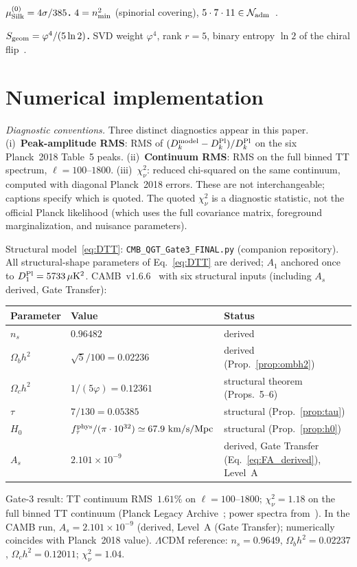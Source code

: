 \documentclass[twocolumn,10pt]{article}
\newcommand{\vp}{\varphi}
\newcommand{\Nadm}{\mathcal{N}_{\rm adm}}
\newcommand{\Sgeom}{S_{\rm geom}}
\newcommand{\mustr}{\mu_{\rm Silk}^{(0)}}
\begin{document}
\noindent\textbf{$\mustr=4\sigma/385$.}
$4=n_{\rm min}^2$ (spinorial covering), $5\cdot7\cdot11\in\Nadm$~\cite{CamKer163}.

\noindent\textbf{$\Sgeom=\vp^4/(5\ln2)$.}
SVD weight $\vp^4$, rank $r=5$, binary entropy $\ln 2$ of the chiral
flip~\cite{CamKer163,CamP14}.

\section{Numerical implementation}
\label{app:C}

\noindent\textit{Diagnostic conventions.}
Three distinct diagnostics appear in this paper.
(i)~\textbf{Peak-amplitude RMS}: RMS of $(D_k^{\rm model}-D_k^{\rm Pl})/D_k^{\rm Pl}$
on the six Planck~2018 Table~5 peaks.
(ii)~\textbf{Continuum RMS}: RMS on the full binned TT spectrum,
$\ell=100$--$1800$.
(iii)~$\chi^2_\nu$: reduced chi-squared on the same continuum,
computed with diagonal Planck~2018 errors.
These are not interchangeable; captions specify which is quoted.
The quoted $\chi^2_\nu$ is a diagnostic statistic, not the official
Planck likelihood (which uses the full covariance matrix, foreground
marginalization, and nuisance parameters).

\medskip

Structural model~\eqref{eq:DTT}: \texttt{CMB\_QGT\_Gate3\_FINAL.py}
(companion repository). All structural-shape parameters of
Eq.~\eqref{eq:DTT} are derived; $A_1$ anchored once
to $D_1^{\rm Pl}=5733\,\mu{\rm K}^2$. CAMB~v1.6.6~\cite{CAMB} with
six structural inputs (including $A_s$ derived, Gate Transfer):
\begin{center}
\small\renewcommand{\arraystretch}{1.2}
\begin{tabular}{p{1.6cm}p{2.6cm}p{3.0cm}}
\toprule
Parameter & Value & Status \\
\midrule
$n_s$ & $0.96482$ & derived \\
$\Omega_bh^2$ & $\sqrt{5}/100=0.02236$ & derived (Prop.~\ref{prop:ombh2}) \\
$\Omega_ch^2$ & $1/(5\vp)=0.12361$ & structural theorem (Props.~5--6) \\
$\tau$ & $7/130=0.05385$ & structural (Prop.~\ref{prop:tau}) \\
$H_0$ & $f_\tau^{\rm phys}/(\pi\cdot10^{32})\simeq67.9~\mathrm{km/s/Mpc}$ & structural (Prop.~\ref{prop:h0}) \\
$A_s$ & $2.101\times10^{-9}$ & derived, Gate Transfer (Eq.~\ref{eq:FA_derived}), Level~A \\
\bottomrule
\end{tabular}
\end{center}
Gate-3 result: TT continuum RMS~$1.61\%$ on $\ell=100$--$1800$; $\chi^2_\nu=1.18$ on
the full binned TT continuum (Planck Legacy Archive~\cite{PLA};
power spectra from~\cite{Planck2018V}).
In the CAMB run, $A_s=2.101\times10^{-9}$ (derived, Level~A (Gate Transfer); numerically coincides with Planck~2018 value).
$\Lambda$CDM reference: $n_s=0.9649$, $\Omega_bh^2=0.02237$,
$\Omega_ch^2=0.12011$; $\chi^2_\nu=1.04$.
\end{document}
